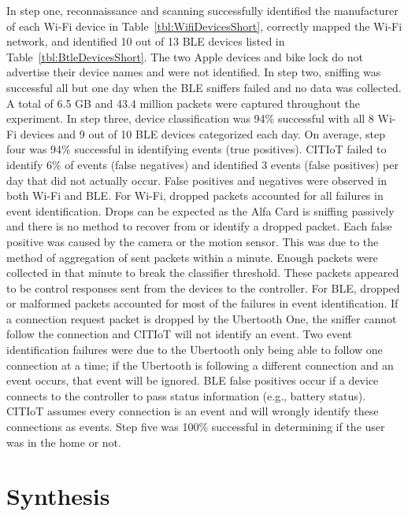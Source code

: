 \documentclass[conference]{./IEEEtran/IEEEtran}
\begin{document}
In step one, reconnaissance and scanning successfully identified the manufacturer of each Wi-Fi device in Table~\ref{tbl:WifiDevicesShort}, correctly mapped the Wi-Fi network, and identified 10 out of 13 \ac{BLE} devices listed in Table~\ref{tbl:BtleDevicesShort}. The two Apple devices and bike lock do not advertise their device names and were not identified. In step two, sniffing was successful all but one day when the \ac{BLE} sniffers failed and no data was collected. A total of 6.5 GB and 43.4 million packets were captured throughout the experiment. In step three, device classification was 94\% successful with all 8 Wi-Fi devices and 9 out of 10 \ac{BLE} devices categorized each day. On average, step four was 94\% successful in identifying events (true positives). CITIoT failed to identify 6\% of events (false negatives) and identified 3 events (false positives) per day that did not actually occur. False positives and negatives were observed in both Wi-Fi and \ac{BLE}. For Wi-Fi, dropped packets accounted for all failures in event identification. Drops can be expected as the Alfa Card is sniffing passively and there is no method to recover from or identify a dropped packet. Each false positive was caused by the camera or the motion sensor. This was due to the method of aggregation of sent packets within a minute. Enough packets were collected in that minute to break the classifier threshold. These packets appeared to be control responses sent from the devices to the controller. For \ac{BLE}, dropped or malformed packets accounted for most of the failures in event identification. If a connection request packet is dropped by the Ubertooth One, the sniffer cannot follow the connection and CITIoT will not identify an event. Two event identification failures were due to the Ubertooth only being able to follow one connection at a time; if the Ubertooth is following a different connection and an event occurs, that event will be ignored. \ac{BLE} false positives occur if a device connects to the controller to pass status information (e.g., battery status). CITIoT assumes every connection is an event and will wrongly identify these connections as events. Step five was 100\% successful in determining if the user was in the home or not. 

\tableWifiResults
\tableBleResults

\section{Synthesis}\label{synthesis}
\end{document}
